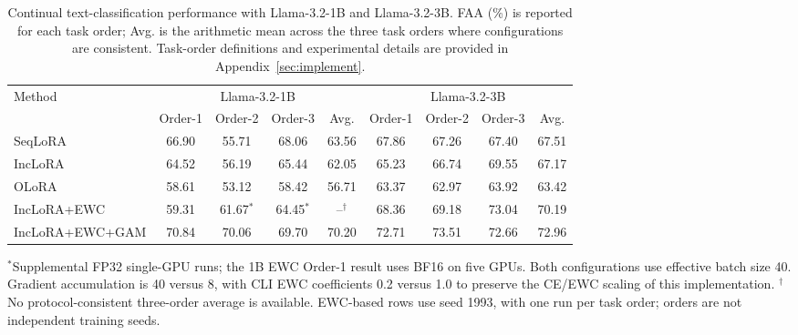 \begin{table}[t]
\centering
\captionsetup{font=footnotesize, labelfont=bf}
\caption{
Continual text-classification performance with Llama-3.2-1B and
Llama-3.2-3B. FAA (\%) is reported for each task order;
Avg. is the arithmetic mean across the three task orders where
configurations are consistent. Task-order definitions and experimental
details are provided in Appendix~\ref{sec:implement}.
}
\label{tab:exp_nlp}
\scriptsize
\setlength{\tabcolsep}{3.6pt}
\renewcommand{\arraystretch}{1.08}
\begin{tabular*}{\linewidth}{@{\extracolsep{\fill}}l*{8}{c}@{}}
\toprule
\multirow{2}{*}{Method}
& \multicolumn{4}{c}{Llama-3.2-1B}
& \multicolumn{4}{c}{Llama-3.2-3B} \\
\cmidrule(lr){2-5}
\cmidrule(lr){6-9}
& Order-1 & Order-2 & Order-3 & Avg.
& Order-1 & Order-2 & Order-3 & Avg. \\
\midrule
SeqLoRA
& 66.90 & 55.71 & 68.06 & 63.56
& 67.86 & 67.26 & 67.40 & 67.51 \\

IncLoRA
& 64.52 & 56.19 & 65.44 & 62.05
& 65.23 & 66.74 & 69.55 & 67.17 \\

OLoRA
& 58.61 & 53.12 & 58.42 & 56.71
& 63.37 & 62.97 & 63.92 & 63.42 \\

IncLoRA+EWC
& 59.31 & 61.67$^{*}$ & 64.45$^{*}$ & --$^{\dagger}$
& 68.36 & 69.18 & 73.04 & 70.19 \\

IncLoRA+EWC+GAM
& 70.84 & 70.06 & 69.70 & 70.20
& 72.71 & 73.51 & 72.66 & 72.96 \\
\bottomrule
\end{tabular*}
\par\vspace{3pt}
\begin{minipage}{\linewidth}
\scriptsize
$^{*}$Supplemental FP32 single-GPU runs; the 1B EWC Order-1 result
uses BF16 on five GPUs. Both configurations use effective batch size 40.
Gradient accumulation is 40 versus 8, with CLI EWC coefficients 0.2
versus 1.0 to preserve the CE/EWC scaling of this implementation.
$^{\dagger}$No protocol-consistent three-order average is available.
EWC-based rows use seed 1993, with one run per task order; orders are
not independent training seeds.
\end{minipage}
\end{table}
